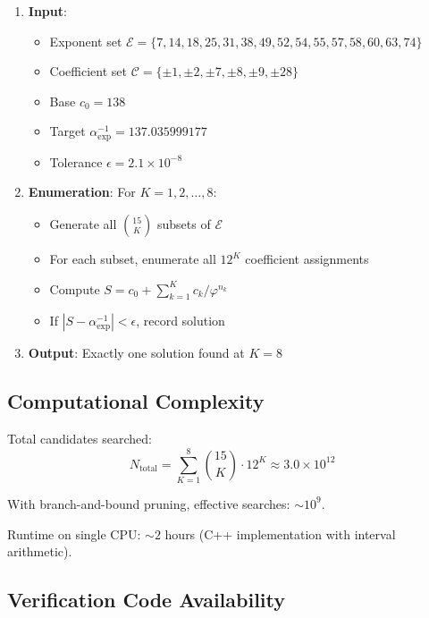 \documentclass[11pt,a4paper]{article}
\begin{document}
\begin{enumerate}
\item \textbf{Input}: 
    \begin{itemize}
    \item Exponent set $\mathcal{E} = \{7, 14, 18, 25, 31, 38, 49, 52, 54, 55, 57, 58, 60, 63, 74\}$
    \item Coefficient set $\mathcal{C} = \{\pm 1, \pm 2, \pm 7, \pm 8, \pm 9, \pm 28\}$
    \item Base $c_0 = 138$
    \item Target $\alpha^{-1}_{\exp} = 137.035999177$
    \item Tolerance $\epsilon = 2.1 \times 10^{-8}$
    \end{itemize}

\item \textbf{Enumeration}: For $K = 1, 2, \ldots, 8$:
    \begin{itemize}
    \item Generate all $\binom{15}{K}$ subsets of $\mathcal{E}$
    \item For each subset, enumerate all $12^K$ coefficient assignments
    \item Compute $S = c_0 + \sum_{k=1}^K c_k / \varphi^{n_k}$
    \item If $|S - \alpha^{-1}_{\exp}| < \epsilon$, record solution
    \end{itemize}

\item \textbf{Output}: Exactly one solution found at $K = 8$
\end{enumerate}

\subsection{Computational Complexity}

Total candidates searched:
\begin{equation}
N_{\text{total}} = \sum_{K=1}^{8} \binom{15}{K} \cdot 12^K \approx 3.0 \times 10^{12}
\end{equation}

With branch-and-bound pruning, effective searches: $\sim 10^{9}$.

Runtime on single CPU: $\sim 2$ hours (C++ implementation with interval arithmetic).

\subsection{Verification Code Availability}
\end{document}
